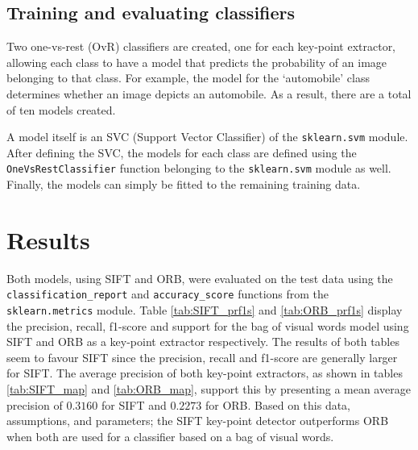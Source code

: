 \documentclass[12pt,a4paper,oneside]{paper}
\begin{document}

\subsection{Training and evaluating classifiers}
Two one-vs-rest (OvR) classifiers are created, one for each key-point extractor, allowing each class to have a model that predicts the probability of an image belonging to that class. For example, the model for the ‘automobile’ class determines whether an image depicts an automobile. As a result, there are a total of ten models created.

A model itself is an SVC (Support Vector Classifier) of the \texttt{sklearn.svm} module.
After defining the SVC, the models for each class are defined using the \texttt{OneVsRestClassifier} function belonging to the \texttt{sklearn.svm} module as well.
Finally, the models can simply be fitted to the remaining training data.




\newpage
\section{Results}
Both models, using SIFT and ORB, were evaluated on the test data using the \texttt{classification\_report} and \texttt{accuracy\_score} functions from the \texttt{sklearn.metrics} module. 
Table \ref{tab:SIFT_prf1s} and \ref{tab:ORB_prf1s} display the precision, recall, f1-score and support for the bag of visual words model using SIFT and ORB as a key-point extractor respectively.
The results of both tables seem to favour SIFT since the precision, recall and f1-score are generally larger for SIFT.
The average precision of both key-point extractors, as shown in tables \ref{tab:SIFT_map} and \ref{tab:ORB_map}, support this by presenting a mean average precision of $0.3160$ for SIFT and $0.2273$ for ORB.
Based on this data, assumptions, and parameters; the SIFT key-point detector outperforms ORB when both are used for a classifier based on a bag of visual words.
\end{document}

